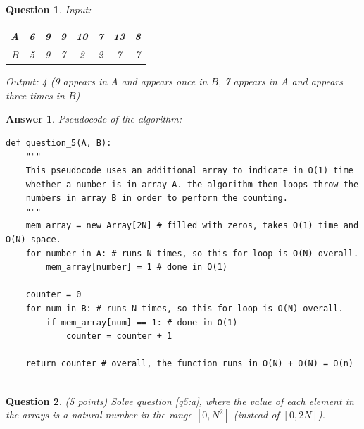 \documentclass[a4paper]{article}
\theoremstyle{remarksStyle}
\theoremstyle{questionStyle}
\newtheorem{question}{Question}
\theoremstyle{answerStyle}
\newtheorem{answer}{Answer}
\begin{document}
\begin{question}
\vspace{1cm}
Input:
\begin{tabular}{|c || c | c  | c | c | c | c | c ||} 
 \hline
 A & 6 & 9 & 9 & 10 & 7 & 13 & 8  \\ 
 \hline
 B & 5 & 9 & 7 & 2 & 2 & 7 & 7  \\ 
 \hline
\end{tabular}

\vspace{0.5cm}
Output:  4 \hspace{1cm} (\textit{9 appears in $A$ and appears once in $B$,  7 appears in $A$  and appears three times in $B$})










\end{question}

\vspace{0.5 cm}

\begin{answer}
    Pseudocode of the algorithm:
\begin{verbatim}
def question_5(A, B):
    """
    This pseudocode uses an additional array to indicate in O(1) time
    whether a number is in array A. the algorithm then loops throw the
    numbers in array B in order to perform the counting.
    """
    mem_array = new Array[2N] # filled with zeros, takes O(1) time and O(N) space.
    for number in A: # runs N times, so this for loop is O(N) overall.
        mem_array[number] = 1 # done in O(1)

    counter = 0
    for num in B: # runs N times, so this for loop is O(N) overall.
        if mem_array[num] == 1: # done in O(1)
            counter = counter + 1

    return counter # overall, the function runs in O(N) + O(N) = O(n)
        
\end{verbatim}
\end{answer}

\vspace{0.75 cm}

\begin{question} \label{q6} (5 points)
Solve question \ref{q5:a}, where the value of each element in the arrays is a natural number in the range $[0,N^2]$ (instead of $[0, 2N]$).
\end{question}

\vspace{0.5 cm}
\end{document}
